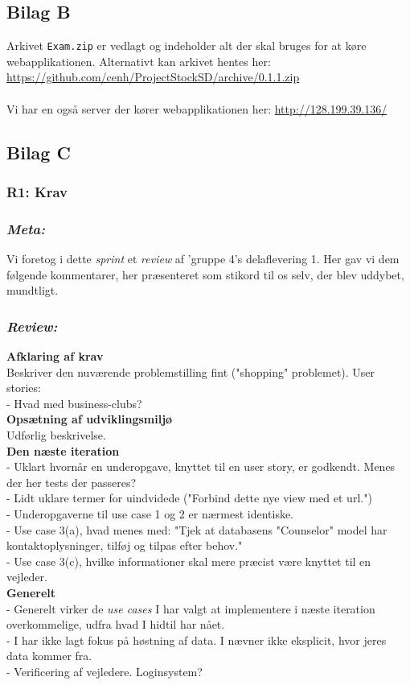 \documentclass[12pt]{article}
\begin{document}
\subsection{Bilag B}
\label{sec:bilagB}
Arkivet \texttt{Exam.zip} er vedlagt og indeholder alt der skal bruges for at køre webapplikationen.
Alternativt kan arkivet hentes her:\\
\url{https://github.com/cenh/ProjectStockSD/archive/0.1.1.zip}\\
\\
Vi har en også server der kører webapplikationen her: \url{http://128.199.39.136/}


\subsection{Bilag C}
\label{sec:bilagC}
\subsubsection{R1: Krav}

\subsubsection*{\textit{Meta:}}
Vi foretog i dette \textit{sprint} et \textit{review} af 'gruppe 4's delaflevering 1. Her gav vi dem følgende kommentarer, her præsenteret som stikord til os selv, der blev uddybet, mundtligt.

\subsubsection*{\textit{Review:}}
\textbf{Afklaring af krav} \\
Beskriver den nuværende problemstilling fint ("shopping" problemet).
User stories: \\
- Hvad med business-clubs?\\
\textbf{Opsætning af udviklingsmiljø} \\
Udførlig beskrivelse.\\
\textbf{Den næste iteration} \\
- Uklart hvornår en underopgave, knyttet til en user story, er godkendt. Menes der her tests der passeres? \\
- Lidt uklare termer for uindvidede ("Forbind dette nye view med et url.") \\
- Underopgaverne til use case 1 og 2 er nærmest identiske. \\
- Use case 3(a), hvad menes med: "Tjek at databasens "Counselor" model har \\ kontaktoplysninger, tilføj og tilpas efter behov." \\
- Use case 3(c), hvilke informationer skal mere præcist være knyttet til en vejleder.\\
\textbf{Generelt} \\
- Generelt virker de \textit{use cases} I har valgt at implementere i næste iteration overkommelige, udfra hvad I hidtil har nået. \\
- I har ikke lagt fokus på høstning af data. I nævner ikke eksplicit, hvor jeres data kommer fra. \\
- Verificering af vejledere. Loginsystem?
\end{document}
